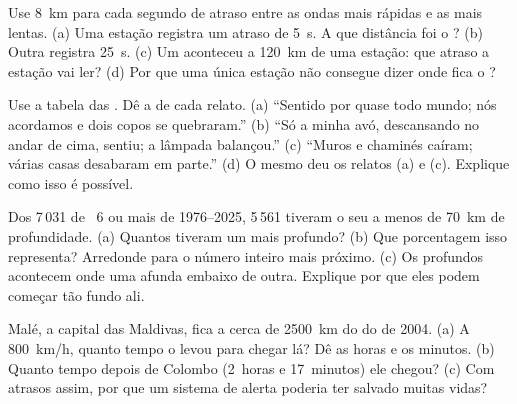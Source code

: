 \begin{exercise}[$\star\star$]\label{exo:g7:earthquakes:7}
Use \qty{8}{km} para cada segundo de atraso entre as ondas mais rápidas e
as mais lentas. (a) Uma estação registra um atraso de \qty{5}{s}. A que
distância foi o ? (b) Outra registra \qty{25}{s}. (c) Um
 aconteceu a \qty{120}{km} de uma estação: que atraso a estação
vai ler? (d) Por que uma única estação não consegue dizer onde fica o
?
\end{exercise}

\begin{exercise}[$\star\star$]\label{exo:g7:earthquakes:8}
Use a tabela das . Dê a  de cada relato.
(a) ``Sentido por quase todo mundo; nós acordamos e dois copos se
quebraram.'' (b) ``Só a minha avó, descansando no andar de cima, sentiu;
a lâmpada balançou.'' (c) ``Muros e chaminés caíram; várias casas
desabaram em parte.'' (d) O mesmo  deu os relatos (a) e (c).
Explique como isso é possível.
\end{exercise}

\begin{exercise}[$\star\star$]\label{exo:g7:earthquakes:9}
Dos 7\,031  de ~6 ou mais de 1976--2025, 5\,561
tiveram o seu  a menos de \qty{70}{km} de profundidade. (a) Quantos
tiveram um  mais profundo? (b) Que porcentagem isso representa?
Arredonde para o número inteiro mais próximo. (c) Os profundos acontecem
onde uma  afunda embaixo de outra. Explique por que eles podem
começar tão fundo ali.
\end{exercise}

\begin{exercise}[$\star\star$]\label{exo:g7:earthquakes:10}
Malé, a capital das Maldivas, fica a cerca de \qty{2500}{km} do
 do  de 2004. (a) A \qty{800}{km/h}, quanto tempo o
 levou para chegar lá? Dê as horas e os minutos. (b) Quanto tempo
depois de Colombo (2~horas e 17~minutos) ele chegou? (c) Com atrasos
assim, por que um sistema de alerta poderia ter salvado muitas vidas?
\end{exercise}

